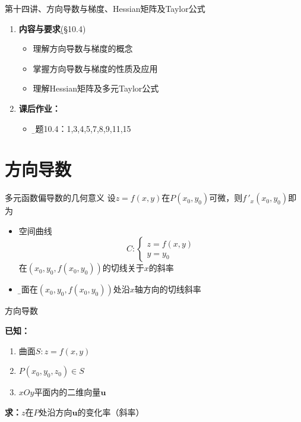 
\begin{frame}{第十四讲、方向导数与梯度、Hessian矩阵及Taylor公式}
	\linespread{1.5}
	\begin{enumerate}
	  \item {\bf 内容与要求}{\b (\S10.4)}
	  \begin{itemize}
	    \item 理解方向导数与梯度的概念
	    \item 掌握方向导数与梯度的性质及应用
	    \item 理解Hessian矩阵及多元Taylor公式
	  \vspace{1em}
	  \end{itemize}
	  \item {\bf  课后作业：}
	  \begin{itemize}
	    \item {\b 习题10.4：1,3,4,5,7,8,9,11,15}
	  \end{itemize}
	\end{enumerate}
\end{frame}

\section{方向导数}

\begin{frame}{多元函数偏导数的几何意义}
	\linespread{1.2}\pause 
	设$z=f(x,y)$在$P(x_0,y_0)$可微，则$f\,'_x(x_0,y_0)$即为
	\begin{itemize}
	  \item 空间曲线
	  $$C:\left\{\begin{array}{l}
	  	z=f(x,y)\\ y=y_0
	  \end{array}\right.$$
	  在$(x_0,y_0,f(x_0,y_0))$的切线关于$x$的斜率\pause 
	  \item {\b 曲面在$(x_0,y_0,f(x_0,y_0))$处沿$x$轴方向的切线斜率}
	\end{itemize}
	\bigskip\pause 
	\centerline{}
\end{frame}

\begin{frame}{方向导数}
	\linespread{1.2}
	\centerline{}
	
	\bigskip\pause 
	{\bf 已知：}\pause 
	\begin{enumerate}
	  \item 曲面$S:z=f(x,y)$\pause 
	  \item $P(x_0,y_0,z_0)\in S$\pause 
	  \item $xOy$平面内的二维向量$\bm{u}$\pause 
	\end{enumerate}
	\bigskip
	{\bf 求：}$z$在$P$处沿方向$\bm{u}$的变化率（斜率）
\end{frame}

